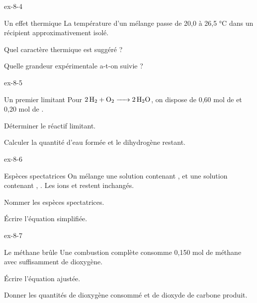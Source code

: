 \begin{blocLivre}{ex-8-4}\begin{exercice}[1]{Un effet thermique}
La température d’un mélange passe de 20,0 à 26,5 °C dans un récipient approximativement isolé.
\begin{questions}
\item Quel caractère thermique est suggéré ?
\item Quelle grandeur expérimentale a-t-on suivie ?
\end{questions}
\end{exercice}\end{blocLivre}
\begin{blocLivre}{ex-8-5}\begin{exercice}[2]{Un premier limitant}
Pour $\ce{2 H2 + O2 -> 2 H2O}$, on dispose de 0,60 mol de  et 0,20 mol de .
\begin{questions}
\item Déterminer le réactif limitant.
\item Calculer la quantité d’eau formée et le dihydrogène restant.
\end{questions}
\end{exercice}\end{blocLivre}
\begin{blocLivre}{ex-8-6}\begin{exercice}[2]{Espèces spectatrices}
On mélange une solution contenant ,  et une solution contenant , . Les ions  et  restent inchangés.
\begin{questions}
\item Nommer les espèces spectatrices.
\item Écrire l’équation simplifiée.
\end{questions}
\end{exercice}\end{blocLivre}
\begin{blocLivre}{ex-8-7}\begin{exercice}[2]{Le méthane brûle}
Une combustion complète consomme 0,150 mol de méthane avec suffisamment de dioxygène.
\begin{questions}
\item Écrire l’équation ajustée.
\item Donner les quantités de dioxygène consommé et de dioxyde de carbone produit.
\end{questions}
\end{exercice}\end{blocLivre}
